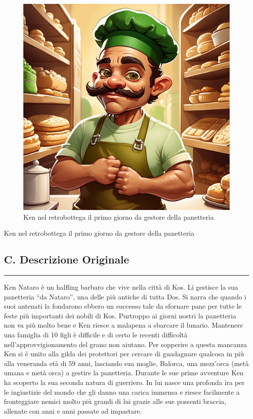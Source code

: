 \begin{figure}
\centering
\includegraphics{create-a-digital-illustration-of-ken-nataro-a-mulatto-skinned-halfling-with-a-sturdy-physique-ken--6.png}
\caption{Ken nel retrobottega il primo giorno da gestore della
panetteria}
\end{figure}

Ken nel retrobottega il primo giorno da gestore della panetteria

\subsection{C. Descrizione Originale}\label{c.-descrizione-originale}

\begin{center}\rule{0.5\linewidth}{0.5pt}\end{center}

Ken Nataro è un halfling barbaro che vive nella città di Kos. Lì
gestisce la sua panetteria ``da Nataro'', una delle più antiche di tutta
Dos. Si narra che quando i suoi antenati la fondarono ebbero un successo
tale da sfornare pane per tutte le feste più importanti dei nobili di
Kos. Purtroppo ai giorni nostri la panetteria non va più molto bene e
Ken riesce a malapena a sbarcare il lunario. Mantenere una famiglia di
10 figli è difficile e di certo le recenti difficoltà
nell'approvvigionamento del grano non aiutano. Per sopperire a questa
mancanza Ken si è unito alla gilda dei protettori per cercare di
guadagnare qualcosa in più alla veneranda età di 59 anni, lasciando sua
moglie, Balorca, una mezz'orca (metà umana e metà orca) a gestire la
panetteria. Durante le sue prime avventure Ken ha scoperto la sua
seconda natura di guerriero. In lui nasce una profonda ira per le
ingiustizie del mondo che gli danno una carica immensa e riesce
facilmente a fronteggiare nemici molto più grandi di lui grazie alle sue
possenti braccia, allenate con anni e anni passate ad impastare.

